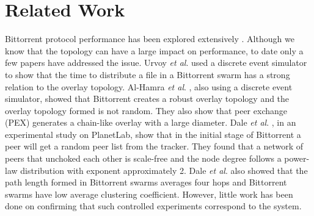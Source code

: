 \chapter{Related Work}

Bittorrent protocol performance has been explored extensively \cite{guo2005measurements}\cite{legout2006rarest}\cite{pouwelse2004measurement}\cite{tian2007modeling}\cite{li2010measurement}\cite{zhang2010bittorrent}.  
Although we know that the topology can have a large impact on performance, to date only a few papers have addressed the issue.
Urvoy \textit{et al}. \cite{urvoy2007impact} used a discrete event simulator to show that the time to distribute a file in a Bittorrent swarm has a strong relation to the overlay topology.  
Al-Hamra \textit{et al}. \cite{al2007understanding}, also using a discrete event simulator, showed that Bittorrent creates a robust overlay topology and the overlay topology formed is not random. 
They also show that peer exchange (PEX) generates a chain-like overlay with a large diameter. 
Dale \textit{et al}. \cite{dale2008evolution}, in an experimental study on PlanetLab, show that in the initial stage of Bittorrent a peer will get a random peer list from the tracker. 
They found that a network of peers that unchoked each other is scale-free and the node degree follows a power-law distribution with exponent approximately 2. 
Dale \textit{et al}. \cite{dale2008evolution} also showed that the path length formed in Bittorrent swarms averages four hops and Bittorrent swarms have low average clustering coefficient.  
However, little work has been done on confirming that such controlled experiments correspond to the system. %

